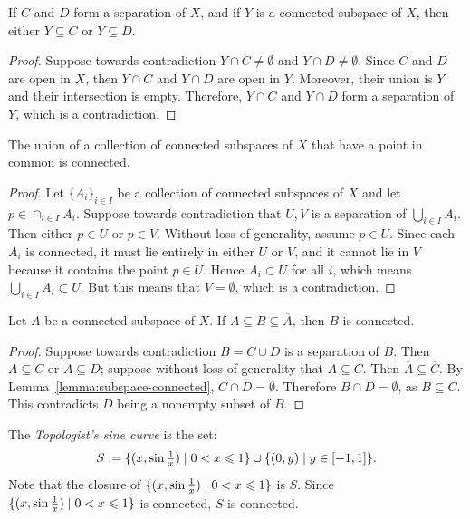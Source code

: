 \begin{lemma}\label{lemma:connected-subspace-inclusion}
    If $C$ and $D$ form a separation of $X$, and if $Y$ is a connected subspace of $X$, then either $Y \subseteq C$ or $Y \subseteq D$. 
\end{lemma}
    \begin{proof}
        Suppose towards contradiction $Y \cap C \neq \emptyset$ and $Y \cap D \neq \emptyset$. Since $C$ and $D$ are open in $X$, then $Y \cap C$ and $Y \cap D$ are open in $Y$. Moreover, their union is $Y$ and their intersection is empty. Therefore, $Y \cap C$ and $Y \cap D$ form a separation of $Y$, which is a contradiction.
    \end{proof}

\begin{theorem}\label{thm:connected-if-shared-points}
    The union of a collection of connected subspaces of $X$ that have a point in common is connected.
\end{theorem}
    \begin{proof}
        Let $\{A_i\}_{i \in I}$ be a collection of connected subspaces of $X$ and let $p \in \cap_{i \in I}A_i$. Suppose towards contradiction that $U,V$ is a separation of $\bigcup_{i \in I}A_i$. Then either $p \in U$ or $p \in V$. Without loss of generality, assume $p \in U$. Since each $A_i$ is connected, it must lie entirely in either $U$ or $V$, and it cannot lie in $V$ because it contains the point $p \in U$. Hence $A_i \subset U$ for all $i$, which means $\bigcup_{i \in I}A_i \subset U$. But this means that $V = \emptyset$, which is a contradiction.
    \end{proof}

\begin{theorem}
    Let $A$ be a connected subspace of $X$. If $A \subseteq B \subseteq \overline{A}$, then $B$ is connected.
\end{theorem}
    \begin{proof}
        Suppose towards contradiction $B = C \cup D$ is a separation of $B$. Then $A \subseteq C$ or $A \subseteq D$; suppose without loss of generality that $A \subseteq C$. Then $\overline{A} \subseteq \overline{C}$. By Lemma~\ref{lemma:subspace-connected}, $\overline{C} \cap D = \emptyset$. Therefore $B \cap D = \emptyset$, as $B \subseteq \overline{C}$. This contradicts $D$ being a nonempty subset of $B$.
    \end{proof}

\begin{example}
    The \textit{Topologist's sine curve} is the set:
        \begin{equation*}
        \begin{split}
            S := \{(x,\sin {\textstyle\frac{1}{x}}) \mid 0 < x \leqslant 1\} \cup \{(0,y) \mid y \in [-1,1]\}.
        \end{split}
        \end{equation*}
    Note that the closure of $\{(x,\sin {\textstyle\frac{1}{x}}) \mid 0 < x \leqslant 1\}$ is $S$. Since $\{(x,\sin {\textstyle\frac{1}{x}}) \mid 0 < x \leqslant 1\}$ is connected, $S$ is connected.
\end{example}

